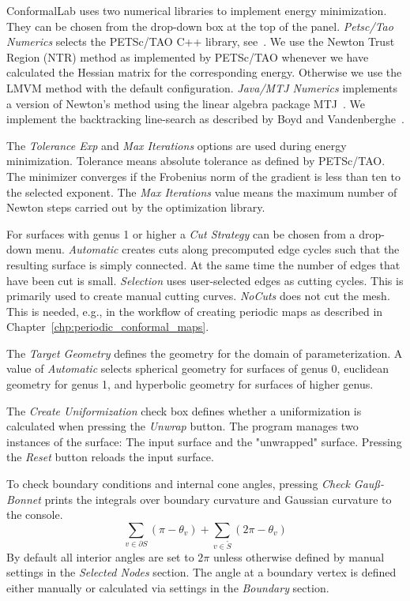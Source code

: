 \documentclass[Thesis.tex]{subfiles}
\begin{document}
{\sc ConformalLab} uses two numerical libraries to implement energy minimization. 
They can be chosen from the drop-down box at the top of the panel. 
\emph{Petsc/Tao Numerics} selects the {\sc PETSc/TAO} C++ library, see~\cite{petsc-web-page, tao-user-ref}. 
We use the Newton Trust Region (NTR) method as implemented by {\sc PETSc/TAO} whenever we have calculated the Hessian matrix for the corresponding energy. 
Otherwise we use the LMVM method with the default configuration. 
\emph{Java/MTJ Numerics} implements a version of Newton's method using the linear algebra package MTJ~\cite{mtj-website}. 
We implement the backtracking line-search as described by Boyd and Vandenberghe~\cite[pp.~464]{boyd2004convex}.

The \emph{Tolerance Exp} and \emph{Max Iterations} options are used during energy minimization. 
Tolerance means absolute tolerance as defined by {\sc PETSc/TAO}. 
The minimizer converges if the Frobenius norm of the gradient is less than ten to the selected exponent. The \emph{Max Iterations} value means the maximum number of Newton steps carried out by the optimization library.

For surfaces with genus 1 or higher a \emph{Cut Strategy} can be chosen from a drop-down menu. 
\emph{Automatic} creates cuts along precomputed edge cycles such that the resulting surface is simply connected. 
At the same time the number of edges that have been cut is small. 
\emph{Selection} uses user-selected edges as cutting cycles. 
This is primarily used to create manual cutting curves. 
\emph{NoCuts} does not cut the mesh. 
This is needed, e.g., in the workflow of creating periodic maps as described in Chapter~\ref{chp:periodic_conformal_maps}.

The \emph{Target Geometry} defines the geometry for the domain of parameterization. 
A value of \emph{Automatic} selects spherical geometry for surfaces of genus 0, euclidean geometry for genus 1, and hyperbolic geometry for surfaces of higher genus.

The \emph{Create Uniformization} check box defines whether a uniformization is calculated when pressing the \emph{Unwrap} button. 
The program manages two instances of the surface: The input surface and the "unwrapped" surface. Pressing the \emph{Reset} button reloads the input surface.

To check boundary conditions and internal cone angles, pressing \emph{Check Gau\ss-Bonnet} prints the integrals over boundary curvature and Gaussian curvature to the console. 
\[\sum_{v \in \partial S} \left(\pi - \theta_v\right) + \sum_{v \in \mathring{S}}\left(2\pi - \theta_v\right)\]
By default all interior angles are set to $2\pi$ unless otherwise defined by manual settings in the \emph{Selected Nodes} section. The angle at a boundary vertex is defined either manually or calculated via settings in the \emph{Boundary} section.
\end{document}
